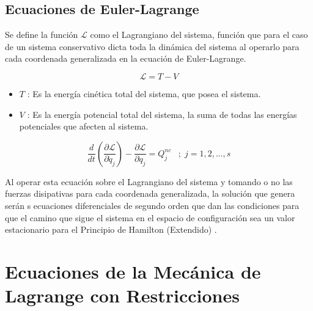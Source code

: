 \documentclass[/home/hernan/Documentos/Apuntes_mecanica_teorica/main.tex]{subfiles}
\begin{document}
    \subsection{Ecuaciones de Euler-Lagrange}

    \begin{definition}
        Se define la función $\mathcal{L}$ como el Lagrangiano del sistema, función que para el caso de un sistema conservativo dicta toda la dinámica del sistema al operarlo para cada coordenada generalizada en la ecuación de Euler-Lagrange.

        \begin{equation}
            \mathcal{L} = T - V
            \label{eq: Lagrangiano}
        \end{equation}

        \begin{itemize}
            \item $T$ : Es la energía cinética total del sistema, que posea el sistema.
            \item $V$ : Es la energía potencial total del sistema, la suma de todas las energías potenciales que afecten al sistema.
        \end{itemize}
        
    \end{definition}

    \begin{definition} 
        
        \begin{equation}
            \frac{d}{d t} \left(\frac{\partial \mathcal{L} }{\partial \dot{q}_{j}} \right) - \frac{\partial \mathcal{L}}{\partial q_{j}} =  Q_{j}^{nc} \; \; \; ; \; j=1,2,...,s
            \label{eq: eqlagrange}
        \end{equation}

        Al operar esta ecuación sobre el Lagrangiano del sistema y tomando o no las fuerzas disipativas para cada coordenada generalizada, la solución que genera serán s ecuaciones diferenciales de segundo orden que dan las condiciones para que el camino que sigue el sistema en el espacio de configuración sea un valor estacionario para el Principio de Hamilton (Extendido) .
        
    \end{definition}

    \section{Ecuaciones de la Mecánica de Lagrange con Restricciones}
\end{document}
